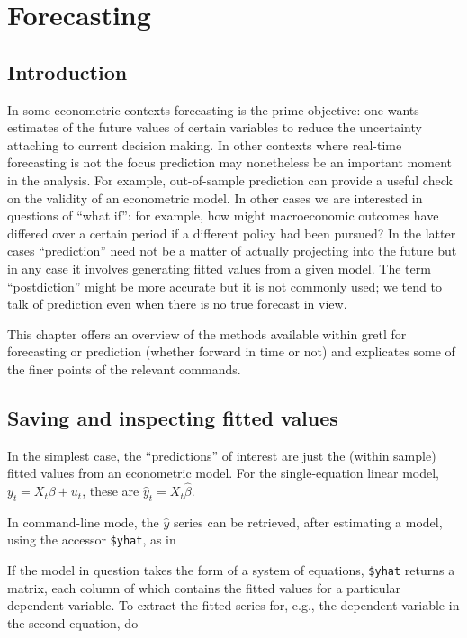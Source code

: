 \chapter{Forecasting}
\label{chap:forecast}

\section{Introduction}
\label{sec:fcast-intro}

In some econometric contexts forecasting is the prime objective: one
wants estimates of the future values of certain variables to reduce
the uncertainty attaching to current decision making.  In other
contexts where real-time forecasting is not the focus prediction
may nonetheless be an important moment in the analysis.  For example,
out-of-sample prediction can provide a useful check on the validity of
an econometric model.  In other cases we are interested in questions
of ``what if'': for example, how might macroeconomic outcomes have
differed over a certain period if a different policy had been pursued?
In the latter cases ``prediction'' need not be a matter of actually
projecting into the future but in any case it involves generating
fitted values from a given model.  The term ``postdiction'' might be
more accurate but it is not commonly used; we tend to talk of
prediction even when there is no true forecast in view.

This chapter offers an overview of the methods available within
gretl for forecasting or prediction (whether forward in time or
not) and explicates some of the finer points of the relevant commands.

\section{Saving and inspecting fitted values}
\label{sec:fcast-fitted}

In the simplest case, the ``predictions'' of interest are just the
(within sample) fitted values from an econometric model.  For the
single-equation linear model, $y_t = X_t \beta + u_t$, these are
$\hat{y}_t = X_t \hat{\beta}$.  

In command-line mode, the $\hat{y}$ series can be retrieved, after
estimating a model, using the accessor \verb|$yhat|, as in
%
% 
If the model in question takes the form of a system of equations,
\verb|$yhat| returns a matrix, each column of which contains the
fitted values for a particular dependent variable.  To extract
the fitted series for, e.g., the dependent variable in the second
equation, do
%

